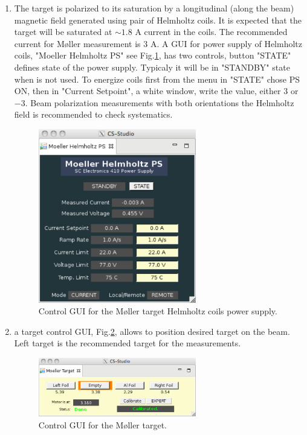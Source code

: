 \begin{enumerate}
\begin{enumerate}
\item The target is polarized to its saturation by a longitudinal (along the beam) magnetic field generated using pair of Helmholtz coils. It is expected that the target will be saturated at $\sim 1.8$ A current in the coils. The recommended current for M{\o}ller measurement is $3$ A. A GUI for power supply of Helmholtz coils, "Moeller Helmholtz PS" see Fig.\ref{fig:moller_helm}, has two controls, button "STATE" defines state of the power supply. Typicaly it will be in "STANDBY" state when is not used. To energize coils first from the menu in "STATE" chose PS ON, then in "Current Setpoint", a white window, write the value, either $3$ or $-3$. Beam polarization measurements with both orientations the Helmholtz field is recommended to check systematics.    

\begin{figure}
\begin{center}
\includegraphics[width=0.65\textwidth]{pics/moller_helmholtz.pdf}
\caption{Control GUI for the M{\o}ller target Helmholtz coils power supply.}
\label{fig:moller_helm}
\end{center}
\end{figure}

\item a target control GUI, Fig.\ref{fig:moller_target}, allows to position desired target on the beam. Left target is the recommended target for the measurements.

\begin{figure}
\begin{center}
\includegraphics[width=0.65\textwidth]{pics/moller_target.pdf}
\caption{Control GUI for the M{\o}ller target.}
\label{fig:moller_target}
\end{center}
\end{figure}


\end{enumerate}
\end{enumerate}

